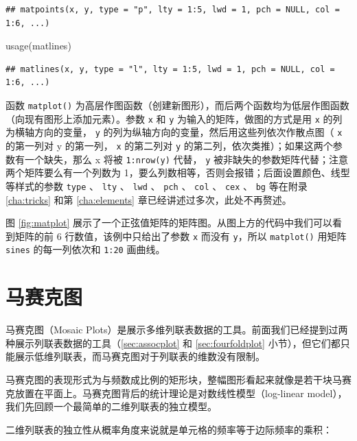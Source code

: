 \documentclass[
  b5paper,
  UTF8,twoside]{book}
\newenvironment{Shaded}{\begin{snugshade}}{\end{snugshade}}
\newcommand{\FunctionTok}[1]{\textcolor[rgb]{0.00,0.00,0.00}{#1}}
\newcommand{\NormalTok}[1]{#1}
\begin{document}
\begin{verbatim}
## matpoints(x, y, type = "p", lty = 1:5, lwd = 1, pch = NULL, col = 1:6, ...)
\end{verbatim}

\begin{Shaded}
\begin{Highlighting}[]
\FunctionTok{usage}\NormalTok{(matlines)}
\end{Highlighting}
\end{Shaded}

\begin{verbatim}
## matlines(x, y, type = "l", lty = 1:5, lwd = 1, pch = NULL, col = 1:6, ...)
\end{verbatim}

函数 \texttt{matplot()} 为高层作图函数（创建新图形），而后两个函数均为低层作图函数（向现有图形上添加元素）。参数 \texttt{x} 和 \texttt{y} 为输入的矩阵，做图的方式是用 \texttt{x} 的列为横轴方向的变量， \texttt{y} 的列为纵轴方向的变量，然后用这些列依次作散点图（ \texttt{x} 的第一列对 y 的第一列， \texttt{x} 的第二列对 \texttt{y} 的第二列，依次类推）；如果这两个参数有一个缺失，那么 x 将被 \texttt{1:nrow(y)} 代替， \texttt{y} 被非缺失的参数矩阵代替；注意两个矩阵要么有一个列数为 1，要么列数相等，否则会报错；后面设置颜色、线型等样式的参数 \texttt{type} 、 \texttt{lty} 、 \texttt{lwd} 、 \texttt{pch} 、 \texttt{col} 、 \texttt{cex} 、 \texttt{bg} 等在附录 \ref{cha:tricks} 和第 \ref{cha:elements} 章已经讲述过多次，此处不再赘述。

图 \ref{fig:matplot}
展示了一个正弦值矩阵的矩阵图。从图上方的代码中我们可以看到矩阵的前 6 行数值，该例中只给出了参数 \texttt{x} 而没有 \texttt{y}，所以 \texttt{matplot()} 用矩阵 \texttt{sines} 的每一列依次和 \texttt{1:20} 画曲线。

\hypertarget{sec:mosaicplot}{%
\section{马赛克图}\label{sec:mosaicplot}}

马赛克图（Mosaic Plots）是展示多维列联表数据的工具。前面我们已经提到过两种展示列联表数据的工具（\ref{sec:assocplot} 和 \ref{sec:fourfoldplot} 小节），但它们都只能展示低维列联表，而马赛克图对于列联表的维数没有限制。

马赛克图的表现形式为与频数成比例的矩形块，整幅图形看起来就像是若干块马赛克放置在平面上。马赛克图背后的统计理论是对数线性模型（log-linear model），我们先回顾一个最简单的二维列联表的独立模型。

二维列联表的独立性从概率角度来说就是单元格的频率等于边际频率的乘积：
\end{document}
